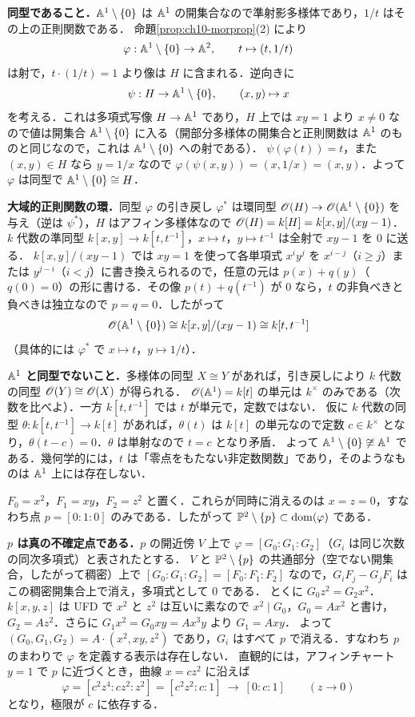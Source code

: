 \textbf{同型であること．}$\mathbb{A}^1\setminus\{0\}$ は $\mathbb{A}^1$ の開集合なので準射影多様体であり，$1/t$ はその上の正則関数である．
命題\ref{prop:ch10-morprop}(2) により
\[
  \varphi:\mathbb{A}^1\setminus\{0\}\to\mathbb{A}^2,\qquad t\mapsto(t,1/t)
\]
は射で，$t\cdot(1/t)=1$ より像は $H$ に含まれる．逆向きに
\[
  \psi:H\to\mathbb{A}^1\setminus\{0\},\qquad (x,y)\mapsto x
\]
を考える．これは多項式写像 $H\to\mathbb{A}^1$ であり，$H$ 上では $xy=1$ より $x\neq0$ なので値は開集合 $\mathbb{A}^1\setminus\{0\}$ に入る（開部分多様体の開集合と正則関数は $\mathbb{A}^1$ のものと同じなので，これは $\mathbb{A}^1\setminus\{0\}$ への射である）．
$\psi(\varphi(t))=t$，また $(x,y)\in H$ なら $y=1/x$ なので $\varphi(\psi(x,y))=(x,1/x)=(x,y)$．よって $\varphi$ は同型で $\mathbb{A}^1\setminus\{0\}\cong H$．

\textbf{大域的正則関数の環．}同型 $\varphi$ の引き戻し $\varphi^*$ は環同型 $\mathscr{O}(H)\to\mathscr{O}(\mathbb{A}^1\setminus\{0\})$ を与え（逆は $\psi^*$），$H$ はアフィン多様体なので $\mathscr{O}(H)=k[H]=k[x,y]/(xy-1)$．
$k$ 代数の準同型 $k[x,y]\to k[t,t^{-1}]$，$x\mapsto t$，$y\mapsto t^{-1}$ は全射で $xy-1$ を $0$ に送る．
$k[x,y]/(xy-1)$ では $xy=1$ を使って各単項式 $x^iy^j$ を $x^{i-j}$（$i\ge j$）または $y^{j-i}$（$i<j$）に書き換えられるので，任意の元は $p(x)+q(y)$（$q(0)=0$）の形に書ける．その像 $p(t)+q(t^{-1})$ が $0$ なら，$t$ の非負べきと負べきは独立なので $p=q=0$．したがって
\[
  \mathscr{O}(\mathbb{A}^1\setminus\{0\})\cong k[x,y]/(xy-1)\cong k[t,t^{-1}]
\]
（具体的には $\varphi^*$ で $x\mapsto t$，$y\mapsto 1/t$）．

\textbf{$\mathbb{A}^1$ と同型でないこと．}多様体の同型 $X\cong Y$ があれば，引き戻しにより $k$ 代数の同型 $\mathscr{O}(Y)\cong\mathscr{O}(X)$ が得られる．
$\mathscr{O}(\mathbb{A}^1)=k[t]$ の単元は $k^\times$ のみである（次数を比べよ）．一方 $k[t,t^{-1}]$ では $t$ が単元で，定数ではない．
仮に $k$ 代数の同型 $\theta:k[t,t^{-1}]\to k[t]$ があれば，$\theta(t)$ は $k[t]$ の単元なので定数 $c\in k^\times$ となり，$\theta(t-c)=0$．$\theta$ は単射なので $t=c$ となり矛盾．
よって $\mathbb{A}^1\setminus\{0\}\not\cong\mathbb{A}^1$ である．幾何学的には，$t$ は「零点をもたない非定数関数」であり，そのようなものは $\mathbb{A}^1$ 上には存在しない．

$F_0=x^2$，$F_1=xy$，$F_2=z^2$ と置く．これらが同時に消えるのは $x=z=0$，すなわち点 $p=[0:1:0]$ のみである．したがって $\mathbb{P}^2\setminus\{p\}\subset\mathrm{dom}(\varphi)$ である．

\textbf{$p$ は真の不確定点である．}$p$ の開近傍 $V$ 上で $\varphi=[G_0:G_1:G_2]$（$G_i$ は同じ次数の同次多項式）と表されたとする．
$V$ と $\mathbb{P}^2\setminus\{p\}$ の共通部分（空でない開集合，したがって稠密）上で $[G_0:G_1:G_2]=[F_0:F_1:F_2]$ なので，$G_iF_j-G_jF_i$ はこの稠密開集合上で消え，多項式として $0$ である．
とくに $G_0z^2=G_2x^2$．$k[x,y,z]$ は UFD で $x^2$ と $z^2$ は互いに素なので $x^2\mid G_0$，$G_0=Ax^2$ と書け，$G_2=Az^2$．さらに $G_1x^2=G_0xy=Ax^3y$ より $G_1=Axy$．
よって $(G_0,G_1,G_2)=A\cdot(x^2,xy,z^2)$ であり，$G_i$ はすべて $p$ で消える．すなわち $p$ のまわりで $\varphi$ を定義する表示は存在しない．
直観的には，アフィンチャート $y=1$ で $p$ に近づくとき，曲線 $x=cz^2$ に沿えば
\[
  \varphi=[c^2z^4:cz^2:z^2]=[c^2z^2:c:1]\ \longrightarrow\ [0:c:1]\qquad(z\to0)
\]
となり，極限が $c$ に依存する．

